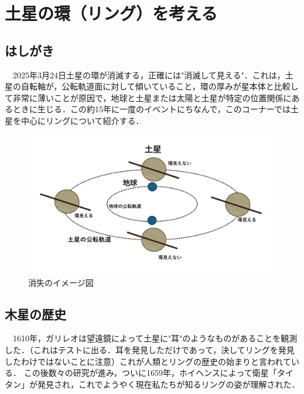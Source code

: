 \documentclass[../main]{subfiles}
\begin{document}
\chapter{土星の環（リング）を考える} %

\section{はしがき}
　2025年3月24日土星の環が消滅する，正確には"消滅して見える"．これは，土星の自転軸が，公転軌道面に対して傾いていること，環の厚みが星本体と比較して非常に薄いことが原因で，地球と土星または太陽と土星が特定の位置関係にあるときに生じる．この約15年に一度のイベントにちなんで，このコーナーでは土星を中心にリングについて紹介する．
\begin{figure}[htbp]
    \centering
    \includegraphics[width=14cm]{sections/kurahara/部誌用/スライド3.JPG}
    \caption{消失のイメージ図}
\end{figure}

\section{木星の歴史}
　1610年，ガリレオは望遠鏡によって土星に"耳"のようなものがあることを観測した．（これはテストに出る．耳を発見しただけであって，決してリングを発見したわけではないことに注意）これが人類とリングの歴史の始まりと言われている．
この後数々の研究が進み，ついに1659年，ホイヘンスによって衛星「タイタン」が発見され，これでようやく現在私たちが知るリングの姿が理解された．
\end{document}
